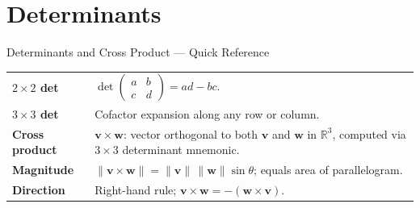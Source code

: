 

% 
\section{Determinants}

\begin{toolkitbox}{Determinants and Cross Product --- Quick Reference}
\begin{tabular}{@{}p{}p{}@{}}
\textbf{$2\times 2$ det}  & $\det\begin{pmatrix} a & b \\ c & d \end{pmatrix} = ad - bc$. \\[6pt]
\textbf{$3\times 3$ det}  & Cofactor expansion along any row or column. \\[4pt]
\textbf{Cross product}    & $\mathbf{v} \times \mathbf{w}$: vector orthogonal to both $\mathbf{v}$ and $\mathbf{w}$ in $\mathbb{R}^3$, computed via $3\times 3$ determinant mnemonic. \\[4pt]
\textbf{Magnitude}        & $\|\mathbf{v} \times \mathbf{w}\| = \|\mathbf{v}\|\,\|\mathbf{w}\|\sin\theta$; equals area of parallelogram. \\[4pt]
\textbf{Direction}        & Right-hand rule; $\mathbf{v} \times \mathbf{w} = -(\mathbf{w} \times \mathbf{v})$. \\
\end{tabular}
\end{toolkitbox}



% 
